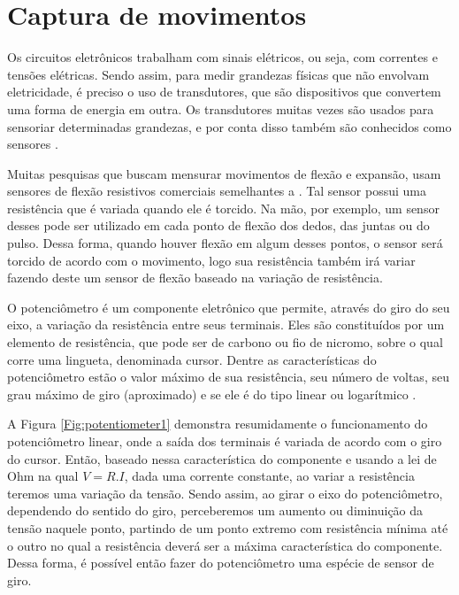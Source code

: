 \documentclass[
	12pt,				%
	openright,			%
	oneside,			%
	a4paper,			%
	english,			%
	brazil				%
	]{abntex2}
\begin{document}
		\section{Captura de movimentos}



		Os circuitos eletrônicos trabalham com sinais elétricos, ou seja, com correntes e tensões elétricas. Sendo assim, para medir grandezas físicas que não envolvam eletricidade, é preciso o uso de transdutores, que são dispositivos que convertem uma forma de energia em outra. Os transdutores muitas vezes são usados para sensoriar determinadas grandezas, e por conta disso também são conhecidos como sensores \cite{ncb2012eletronicabasica}.

		Muitas pesquisas que buscam mensurar movimentos de flexão e expansão, usam sensores de flexão resistivos comerciais semelhantes a \cite{flexsensor}. Tal sensor possui uma resistência que é variada quando ele é torcido. Na mão, por exemplo, um sensor desses pode ser utilizado em cada ponto de flexão dos dedos, das juntas ou do pulso. Dessa forma, quando houver flexão em algum desses pontos, o sensor será torcido de acordo com o movimento, logo sua resistência também irá variar fazendo deste um sensor de flexão baseado na variação de resistência. 
		
		O potenciômetro é um componente eletrônico que permite, através do giro do seu eixo, a variação da resistência entre seus terminais. Eles são constituídos por um elemento de resistência, que pode ser de carbono ou fio de nicromo, sobre o qual corre uma lingueta, denominada cursor. Dentre as características do potenciômetro estão o valor máximo de sua resistência, seu número de voltas, seu grau máximo de giro (aproximado) e se ele é do tipo linear ou logarítmico \cite{ncb2012eletronicabasica}.

		A Figura \ref{Fig:potentiometer1} demonstra resumidamente o funcionamento do potenciômetro linear, onde a saída dos terminais é variada de acordo com o giro do cursor. Então, baseado nessa característica do componente e usando a lei de Ohm na qual $V = R.I$, dada uma corrente constante, ao variar a resistência teremos uma variação da tensão. Sendo assim, ao girar o eixo do potenciômetro, dependendo do sentido do giro, perceberemos um aumento ou diminuição da tensão naquele ponto, partindo de um ponto extremo com resistência mínima até o outro no qual a resistência deverá ser a máxima característica do componente. Dessa forma, é possível então fazer do potenciômetro uma espécie de sensor de giro.
\end{document}
